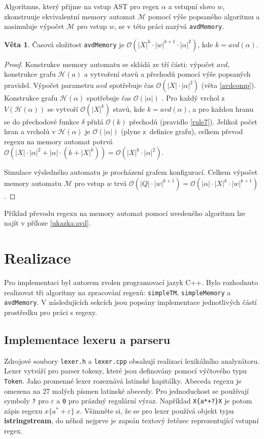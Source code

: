 \documentclass[thesis=B,czech]{FITthesis}[2019/12/23]
\theoremstyle{definition}
\newtheorem{theorem}{Věta}[chapter]
\begin{document}
\begin{enumerate}
	Algoritmus, který přijme na vstup AST pro regex $\alpha$ a vstupní slovo $w$, zkonstruuje ekvivalentní memory automat $\mathcal{M}$ pomocí výše popsaného algoritmu a nasimuluje výpočet $\mathcal{M}$ pro vstup $w$, se v této práci nazývá \texttt{avdMemory}.
	\begin{theorem}
		Časová složitost \texttt{avdMemory} je $\mathcal{O}(|X|^k\cdot|w|^{k+1}\cdot|\alpha|^2)$, kde $k = avd(\alpha)$.
	\end{theorem}
	\begin{proof}
		Konstrukce memory automatu se skládá ze tří části: výpočet $avd$, konstrukce grafu $\mathcal{H}(a)$ a vytvoření stavů a přechodů pomocí výše popsaných pravidel. Výpočet parametru $avd$ spotřebuje čas $\mathcal{O}(|X|\cdot|\alpha|^2)$ (věta \ref{avdcomp}). Konstrukce grafu $\mathcal{H}(\alpha)$ spotřebuje čas $\mathcal{O}(|\alpha|)$ \cite[lemma~3]{schmidref}. Pro každý vrchol z $V(\mathcal{H}(\alpha))$ se vytvoří $\mathcal{O}(|X|^k)$ stavů, kde $k = avd(\alpha)$, a pro každou hranu se do přechodové funkce $\delta$ přidá $\mathcal{O}(k)$ přechodů (pravidlo \ref{rule7}). Jelikož počet hran a vrcholů v $\mathcal{H}(\alpha)$ je $\mathcal{O}(|\alpha|)$ (plyne z~definice grafu), celkem převod regexu na memory automat potrvá $\mathcal{O}(|X|\cdot|\alpha|^2 + |\alpha|\cdot(k+|X|^k)) = \mathcal{O}(|X|^k\cdot|\alpha|^2)$.
	
	Simulace výsledného automatu je procházení grafem konfigurací. Celkem výpočet memory automatu $\mathcal{M}$ pro vstup $w$ trvá ${\mathcal{O}(|Q|\cdot|w|^{k+1})} = {\mathcal{O}(|\alpha|\cdot|X|^k\cdot|w|^{k+1})}$ \cite[lemma 3]{schmidref}.
	\end{proof}

\end{enumerate}

Příklad převodu regexu na memory automat pomocí uvedeného algoritmu lze najít v příloze \ref{ukazka:avd}.
	
\chapter{Realizace}
Pro implementaci byl autorem zvolen programovací jazyk C++. Bylo rozhodnuto realizovat tři algoritmy na zpracování regexů: \texttt{simpleTM}, \texttt{simpleMemory} a \texttt{avdMemory}. V následujících sekcích jsou popsány implementace jednotlivých částí prostředku pro práci s regexy.

\section{Implementace lexeru a parseru}
Zdrojové soubory \texttt{lexer.h} a \texttt{lexer.cpp} obsahují realizaci lexikálního analyzátoru. Lexer vytváří pro parser tokeny, které jsou definovány pomocí výčtového typu \texttt{Token}. Jako promenné lexer rozeznává latinské kapitálky. Abeceda regexu je omezena na 27 malých písmen latinské abecedy. Pro jednoduchost se používají symboly \verb|?| pro $\varepsilon$ a \verb|0| pro prázdný regulární výraz. Například \verb|X{a*+?}X| je potom zápis regexu $x\{a^\ast+\varepsilon\} \ x$.
Všimněte si, že se pro lexer používá objekt typu \textbf{istringstream}, do něhož nejprve je zapsán textový řetězec reprezentující vstupní regex.
\end{document}

